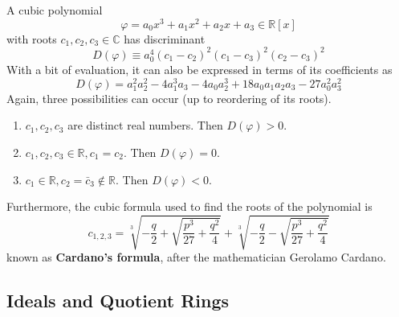 \documentclass{article}
\begin{document}
      \begin{lemma}
        A cubic polynomial 
        \begin{equation}
          \varphi = a_0 x^3 + a_1 x^2 + a_2 x + a_3 \in \mathbb{R}[x]
        \end{equation}
        with roots $c_1, c_2, c_3 \in \mathbb{C}$ has discriminant
        \begin{equation}
          D(\varphi) \equiv a_0^4 (c_1 - c_2)^2 (c_1 - c_3)^2 (c_2 - c_3)^2
        \end{equation}
        With a bit of evaluation, it can also be expressed in terms of its coefficients as
        \begin{equation}
          D(\varphi) = a_1^2 a_2^2 - 4a_1^3 a_3 - 4a_0 a_2^3 + 18 a_0 a_1 a_2 a_3 - 27 a_0^2 a_3^2
        \end{equation}
        Again, three possibilities can occur (up to reordering of its roots). 
        \begin{enumerate}
            \item $c_1, c_2, c_3$ are distinct real numbers. Then $D(\varphi) > 0$. 
            \item $c_1, c_2, c_3 \in \mathbb{R}, c_1 = c_2$. Then $D(\varphi) = 0$. 
            \item $c_1 \in \mathbb{R}, c_2 = \bar{c}_3 \not\in \mathbb{R}$. Then $D(\varphi) < 0$. 
        \end{enumerate}
        Furthermore, the cubic formula used to find the roots of the polynomial is 
        \begin{equation}
          c_{1, 2, 3} = \sqrt[3]{-\frac{q}{2} + \sqrt{\frac{p^3}{27} + \frac{q^2}{4}}} + \sqrt[3]{-\frac{q}{2} - \sqrt{\frac{p^3}{27} + \frac{q^2}{4}}}
        \end{equation}
        known as \textbf{Cardano's formula}, after the mathematician Gerolamo Cardano. 
      \end{lemma}

  \subsection{Ideals and Quotient Rings}
\end{document}
